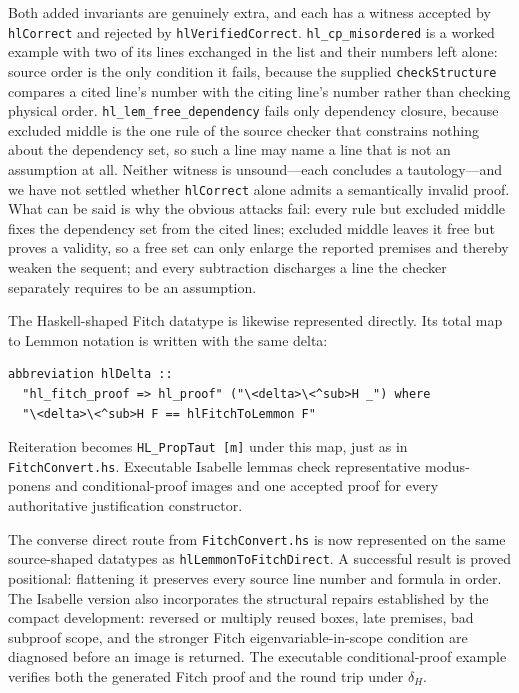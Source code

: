 \documentclass[11pt]{article}
\theoremstyle{plain}
\theoremstyle{definition}
\theoremstyle{remark}
\begin{document}
Both added invariants are genuinely extra, and each has a witness accepted by
\verb|hlCorrect| and rejected by \verb|hlVerifiedCorrect|.
\verb|hl_cp_misordered| is a worked example with two of its lines exchanged in
the list and their numbers left alone: source order is the only condition it
fails, because the supplied \verb|checkStructure| compares a cited line's
number with the citing line's number rather than checking physical order.
\verb|hl_lem_free_dependency| fails only dependency closure, because excluded
middle is the one rule of the source checker that constrains nothing about the
dependency set, so such a line may name a line that is not an assumption at
all. Neither witness is unsound---each concludes a tautology---and we have not
settled whether \verb|hlCorrect| alone admits a semantically invalid proof.
What can be said is why the obvious attacks fail: every rule but excluded
middle fixes the dependency set from the cited lines; excluded middle leaves
it free but proves a validity, so a free set can only enlarge the reported
premises and thereby weaken the sequent; and every subtraction discharges a
line the checker separately requires to be an assumption.

The Haskell-shaped Fitch datatype is likewise represented directly. Its total
map to Lemmon notation is written with the same delta:

\begin{lstlisting}[language={}]
abbreviation hlDelta ::
  "hl_fitch_proof => hl_proof" ("\<delta>\<^sub>H _") where
  "\<delta>\<^sub>H F == hlFitchToLemmon F"
\end{lstlisting}

\noindent Reiteration becomes \verb|HL_PropTaut [m]| under this map, just as
in \verb|FitchConvert.hs|. Executable Isabelle lemmas check representative
modus-ponens and conditional-proof images and one accepted proof for every
authoritative justification constructor.

The converse direct route from \verb|FitchConvert.hs| is now represented on
the same source-shaped datatypes as \verb|hlLemmonToFitchDirect|.  A successful
result is proved positional: flattening it preserves every source line number
and formula in order.  The Isabelle version also incorporates the structural
repairs established by the compact development: reversed or multiply reused
boxes, late premises, bad subproof scope, and the stronger Fitch
eigenvariable-in-scope condition are diagnosed before an image is returned.
The executable conditional-proof example verifies both the generated Fitch
proof and the round trip under $\delta_H$.
\end{document}
